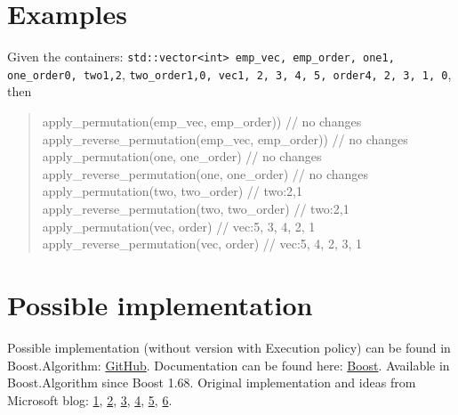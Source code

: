 \documentclass{wg21}
\newcommand{\cc}[1]{\texttt{#1}}
\begin{document}
\section{Examples}
Given the containers: \cc{std::vector<int> emp_vec, emp_order, one{1}, one_order{0}, two{1,2}},
\cc{two_order{1,0}, vec{1, 2, 3, 4, 5}, order{4, 2, 3, 1, 0}}, then 
\begin{quote}
\begin{itemdecl}    
apply_permutation(emp_vec, emp_order))  // no changes
apply_reverse_permutation(emp_vec, emp_order))  // no changes
apply_permutation(one, one_order)  // no changes
apply_reverse_permutation(one, one_order)  // no changes
apply_permutation(two, two_order)  // two:{2,1}
apply_reverse_permutation(two, two_order)  // two:{2,1}
apply_permutation(vec, order)  // vec:{5, 3, 4, 2, 1}
apply_reverse_permutation(vec, order)  // vec:{5, 4, 2, 3, 1}
\end{itemdecl}
\end{quote}


\section{Possible implementation}
Possible implementation (without version with Execution policy) can be found in Boost.Algorithm: \href{https://github.com/boostorg/algorithm/blob/master/include/boost/algorithm/apply_permutation.hpp}{GitHub}. Documentation can be found here: \href{https://www.boost.org/doc/libs/1_70_0/libs/algorithm/doc/html/the_boost_algorithm_library/Misc/apply_permutation.html}{Boost}. Available in Boost.Algorithm since Boost 1.68.
Original implementation and ideas from Microsoft blog: \href{https://blogs.msdn.microsoft.com/oldnewthing/20170102-00/?p=95095}{1}, \href{https://blogs.msdn.microsoft.com/oldnewthing/20170103-00/?p=95105}{2}, \href{https://blogs.msdn.microsoft.com/oldnewthing/20170104-00/?p=95115}{3}, \href{https://blogs.msdn.microsoft.com/oldnewthing/20170109-00/?p=95145}{4}, \href{https://blogs.msdn.microsoft.com/oldnewthing/20170110-00/?p=95155}{5}, \href{https://blogs.msdn.microsoft.com/oldnewthing/20170111-00/?p=95165}{6}.
\end{document}

